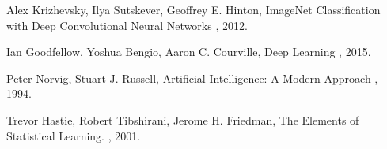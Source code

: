 \documentclass[12pt]{article}
\begin{document}
\newcommand{\noopsort}[1]{} \newcommand{\printfirst}[2]{#1}
  \newcommand{\singleletter}[1]{#1} \newcommand{\switchargs}[2]{#2#1}
\begin{thebibliography}{10}

Alex Krizhevsky, Ilya Sutskever, Geoffrey E. Hinton,
\newblock ImageNet Classification with Deep Convolutional
Neural Networks
, 2012.

Ian Goodfellow, Yoshua Bengio, Aaron C. Courville,
\newblock Deep Learning
, 2015.


Peter Norvig, Stuart J. Russell,
\newblock Artificial Intelligence: A Modern Approach
, 1994.

Trevor Hastie, Robert Tibshirani, Jerome H. Friedman,
\newblock The Elements of Statistical Learning.
, 2001.


\end{thebibliography}
\end{document}
